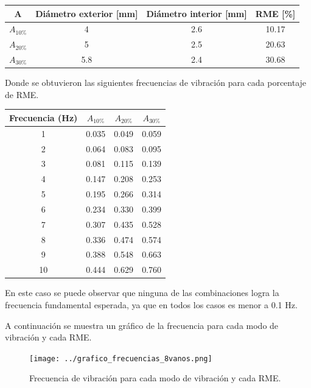 \begin{table}[H]
    \centering
    \begin{tabular}{cccc}
    \toprule
     A & Diámetro exterior [mm] & Diámetro interior [mm] & RME [\%] \\
    \midrule
     $A_{10\%}$ &  4 &  2.6 &  10.17 \\
     $A_{20\%}$ &  5 &  2.5 &  20.63 \\
     $A_{30\%}$ &  5.8 &  2.4 &  30.68 \\
    \bottomrule
    \end{tabular}
\end{table}

Donde se obtuvieron las siguientes frecuencias de vibración para cada porcentaje de RME.

\begin{table}[H]
    \centering
    \begin{tabular}{cccc}
    \toprule
     Frecuencia (Hz) & $A_{10\%}$ & $A_{20\%}$ & $A_{30\%}$ \\
    \midrule
     1 &       0.035 &       0.049 &       0.059 \\
     2 &       0.064 &       0.083 &       0.095 \\
     3 &       0.081 &       0.115 &       0.139 \\
     4 &       0.147 &       0.208 &       0.253 \\
     5 &       0.195 &       0.266 &       0.314 \\
     6 &       0.234 &       0.330 &       0.399 \\
     7 &       0.307 &       0.435 &       0.528 \\
     8 &       0.336 &       0.474 &       0.574 \\
     9 &       0.388 &       0.548 &       0.663 \\
     10 &       0.444 &       0.629 &       0.760 \\
    \bottomrule
    \end{tabular}
\end{table}

En este caso se puede observar que ninguna de las combinaciones logra la frecuencia fundamental esperada, ya que en todos los casos es menor a 0.1 Hz.

A continuación se muestra un gráfico de la frecuencia para cada modo de vibración y cada RME. 

\begin{figure}[H]
    \centering
    \texttt{[image: ../grafico\_frecuencias\_8vanos.png]}
    \caption{Frecuencia de vibración para cada modo de vibración y cada RME.}
\end{figure}

